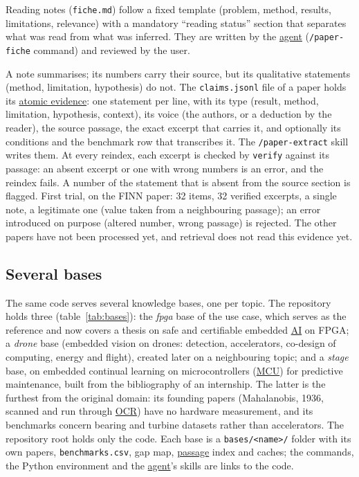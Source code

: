 \documentclass[11pt,a4paper]{article}
\newcommand{\cmd}[1]{\texttt{#1}}
\newcommand{\gl}[2]{\hyperlink{gl:#1}{\textcolor{glcolor}{#2}}}
\begin{document}
Reading notes (\cmd{fiche.md}) follow a fixed template (problem, method, results,
limitations, relevance) with a mandatory ``reading status'' section that separates what was
read from what was inferred. They are written by the \gl{agent}{agent} (\cmd{/paper-fiche} command) and
reviewed by the user.

A note summarises; its numbers carry their source, but its qualitative statements (method,
limitation, hypothesis) do not. The \cmd{claims.jsonl} file of a paper holds its
\gl{claim}{atomic evidence}: one statement per line, with its type (result, method, limitation,
hypothesis, context), its voice (the authors, or a deduction by the reader), the source
passage, the exact excerpt that carries it, and optionally its conditions and the benchmark
row that transcribes it. The \cmd{/paper-extract} skill writes them. At every reindex, each
excerpt is checked by \cmd{verify} against its passage: an absent excerpt or one with wrong
numbers is an error, and the reindex fails. A number of the statement that is absent from the
source section is flagged. First trial, on the FINN paper: 32 items, 32 verified excerpts, a
single note, a legitimate one (value taken from a neighbouring passage); an error introduced
on purpose (altered number, wrong passage) is rejected. The other papers have not been
processed yet, and retrieval does not read this evidence yet.

\subsection{Several bases}
\label{sec:bases}

The same code serves several knowledge bases, one per topic. The repository holds three
(table~\ref{tab:bases}): the \emph{fpga} base of the use case, which serves as the reference
and now covers a thesis on safe and certifiable embedded \gl{AI}{AI} on FPGA; a \emph{drone} base
(embedded vision on drones: detection, accelerators, co-design of computing, energy and
flight), created later on a neighbouring topic; and a \emph{stage} base, on embedded continual
learning on microcontrollers (\gl{MCU}{MCU}) for predictive maintenance, built from the bibliography
of an internship. The latter is the furthest from the original domain: its founding papers
(Mahalanobis, 1936, scanned and run through \gl{OCR}{OCR}) have no hardware measurement, and its
benchmarks concern bearing and turbine datasets rather than accelerators. The repository root
holds only the code. Each base is a \cmd{bases/<name>/} folder with its own papers,
\cmd{benchmarks.csv}, gap map, \gl{passage}{passage} index and caches; the commands, the Python
environment and the \gl{agent}{agent}'s skills are links to the code.
\end{document}
